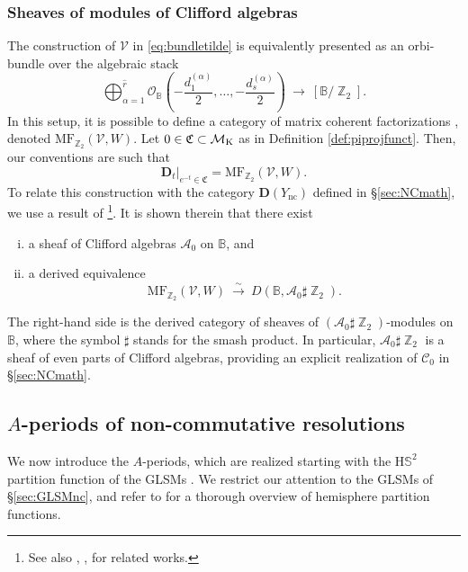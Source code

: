 \documentclass[12pt,a4paper,oneside]{amsart}
\numberwithin{equation}{section}
\theoremstyle{definition}
\theoremstyle{remark}
\DeclareMathOperator{\Z}{\mathbb{Z}}
\newcommand{\hs}{\mathrm{H}\mathbb{S}^2}
\newcommand{\cB}{\mathbb{B}}
\newcommand{\mM}{\mathcal{M}}
\newcommand{\mA}{\mathcal{A}}
\newcommand{\mC}{\mathcal{C}}
\newcommand{\mV}{\mathcal{V}}
\newcommand{\Ync}{Y_{\mathrm{nc}}}
\newcommand{\MF}{\mathrm{MF}}
\newcommand{\DC}{\mathbf{D}}
\begin{document}
\subsubsection{Sheaves of modules of Clifford algebras}
The construction of $\mV$ in \eqref{eq:bundletilde} is equivalently presented as an orbi-bundle \cite{Adem:2007zz} over the algebraic stack
\begin{equation*}
	\bigoplus_{\alpha=1}^{\hat{r}} \mathcal{O}_{\cB} \left( - \frac{d_1^{(\alpha)}}{2} , \dots,  - \frac{d_s^{(\alpha)}}{2} \right) \ \longrightarrow \ [ \cB / \Z_2 ] .
\end{equation*}
In this setup, it is possible to define a category of matrix coherent factorizations \cite{buchweitz1987maximal,Tu:2010nh,ballard2012resolutions,orlov2004triangulated,efimovcoherent}, denoted $\MF_{\Z_2} (\mV, W)$. Let $ 0 \in \mathfrak{C} \subset \mM_{\text{\rm K}}$ as in Definition \ref{def:piprojfunct}. Then, our conventions are such that 
\begin{equation*}
	\left. \DC_t \right\rvert_{e^{-t} \in \mathfrak{C}} = \MF_{\Z_2} (\mV, W) .
\end{equation*}
To relate this construction with the category $\DC (\Ync)$ defined in \S\ref{sec:NCmath}, we use a result of \cite{Guo:2021aqj}\footnote{See also \cite{Caldararu:2010ljp,Addington:2012zv}, \cite[\S2.4]{Katz:2022lyl}, \cite[\S4]{Katz:2023zan} for related works.}. It is shown therein that there exist 
\begin{enumerate}[(i)]
    \item a sheaf of Clifford algebras $\mA_0$ on $\cB$, and 
    \item a derived equivalence 
    \begin{equation*}
	    \MF_{\Z_2} (\mV, W)  \ \xrightarrow{ \ \sim \ } \ D \left( \cB, \mA_0 \sharp \Z_2 \right) .
    \end{equation*}
\end{enumerate} 
The right-hand side is the derived category of sheaves of $(\mA_0 \sharp \Z_2)$-modules on $\cB$, where the symbol $\sharp$ stands for the smash product. In particular, $\mA_0 \sharp \Z_2$ is a sheaf of even parts of Clifford algebras, providing an explicit realization of $\mC_0$ in \S\ref{sec:NCmath}.\par



\subsection{\texorpdfstring{$A$}{A}-periods of non-commutative resolutions}
\label{sec:GLSMHS}
We now introduce the $A$-periods, which are realized starting with the $\hs$ partition function of the GLSMs \cite{Hori:2013ika}. We restrict our attention to the GLSMs of \S\ref{sec:GLSMnc}, and refer to \cite{hori2019notes} for a thorough overview of hemisphere partition functions.
\end{document}
